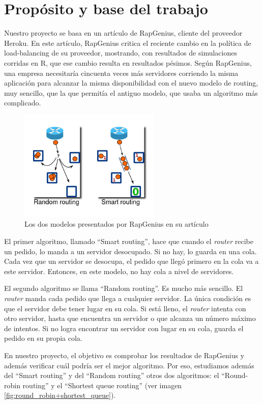 \section{Propósito y base del trabajo}

Nuestro proyecto se basa en un artículo de RapGenius, cliente del proveedor Heroku. En este artículo, RapGenius critica
el reciente cambio en la política de load-balancing de su proveedor, mostrando, con resultados de simulaciones corridas
en R, que ese cambio resulta en resultados pésimos. Según RapGenius, una empresa necesitaría
cincuenta veces más servidores corriendo la misma aplicación para alcanzar la misma disponibilidad con el nuevo modelo
de routing, muy sencillo, que la que permitía el antiguo modelo, que usaba un algoritmo más complicado.

\begin{figure}[h]
    \centering
    \includegraphics[height=200px]{random-smart.png}
    \caption{Los dos modelos presentados por RapGenius en su artículo}
    \label{fig:random+smart}
\end{figure}

El primer algoritmo, llamado ``Smart routing'', hace que cuando el \textit{router} recibe un pedido, lo manda a un servidor
desocupado. Si no hay, lo guarda en una cola. Cada vez que un servidor se desocupa, el pedido que llegó primero en la
cola va a este servidor. Entonces, en este modelo, no hay cola a nivel de servidores.

El segundo algoritmo se llama ``Random routing''. Es mucho más sencillo. El \textit{router} manda cada pedido que llega
a cualquier servidor. La única condición es que el servidor debe tener lugar en su cola. Si está lleno, el
\textit{router} intenta con otro servidor, hasta que encuentra un servidor o que alcanza un número máximo de intentos.
Si no logra encontrar un servidor con lugar en su cola, guarda el pedido en su propia cola.

En nuestro proyecto, el objetivo es comprobar los resultados de RapGenius y además verificar cuál podría ser el mejor
algoritmo. Por eso, estudiamos además del ``Smart routing'' y del ``Random routing'' otros dos algoritmos: el
``Round-robin routing'' y el ``Shortest queue routing'' (ver imagen \ref{fig:round_robin+shortest_queue}).

